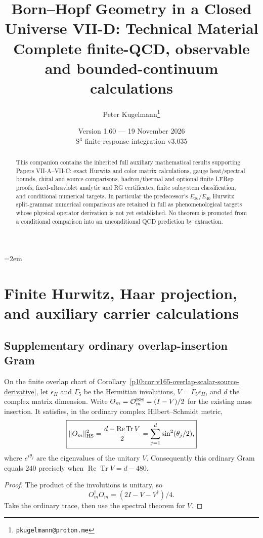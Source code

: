 \documentclass[12pt,a4paper]{article}
\title{\textbf{Born--Hopf Geometry in a Closed Universe VII-D: Technical Material}\\[0.4em]
\large Complete finite-QCD, observable and bounded-continuum calculations}
\author{Peter Kugelmann\thanks{\texttt{pkugelmann@proton.me}}}
\date{Version 1.60 --- 19 November 2026 \\ S$^3$ finite-response integration v3.035}
\begin{document}
\emergencystretch=2em
\maketitle
\begin{abstract}
This companion contains the inherited full auxiliary mathematical results
supporting Papers VII-A--VII-C: exact Hurwitz and color matrix calculations,
gauge heat/spectral bounds, chiral and source comparisons, hadron/thermal and
optional finite LFRep proofs, fixed-ultraviolet analytic and RG certificates,
finite subsystem classification, and conditional numerical targets. In
particular the predecessor's $E_{36}$/$E_{40}$ Hurwitz split-grammar numerical
comparisons are retained in full as phenomenological targets whose physical
operator derivation is not yet established. No theorem is promoted from a
conditional comparison into an unconditional QCD prediction by extraction.
\end{abstract}
\tableofcontents
\listoftables
\clearpage

\section{Finite Hurwitz, Haar projection, and auxiliary carrier calculations}
\label{p13:sec:v237-d1}
\subsection{Supplementary ordinary overlap-insertion Gram}
\label{p10:app:exroot-overlap-gram}

\begin{proposition}
\label{p10:prop:exroot-overlap-gram}
On the finite overlap chart of
Corollary~\ref{p10:cor:v165-overlap-scalar-source-derivative},
let \(\epsilon_H\) and \(\Gamma_5\) be the Hermitian involutions,
\(V=\Gamma_5\epsilon_H\), and \(d\) the complex matrix dimension.
Write \(O_m=\mathcal O_m^{\rm BH}=(I-V)/2\) for the existing mass
insertion. It satisfies, in the ordinary
complex Hilbert--Schmidt metric,
\[
 \boxed{\|O_m\|_{\rm HS}^2
 =\frac{d-\operatorname{Re}\operatorname{Tr}V}{2}
 =\sum_{j=1}^d\sin^2(\theta_j/2),}
\]
where \(e^{i\theta_j}\) are the eigenvalues of the unitary \(V\).
Consequently this ordinary Gram equals \(240\) precisely when
\(\operatorname{Re}\operatorname{Tr}V=d-480\).
\end{proposition}
\begin{proof}
The product of the involutions is unitary, so
\[
 O_m^\dagger O_m=(2I-V-V^\dagger)/4.
\]
Take the ordinary trace, then use the spectral theorem for \(V\).
\end{proof}
\end{document}
